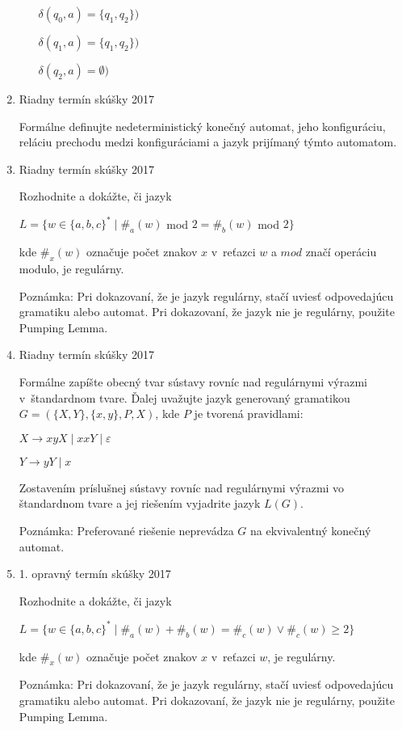 \documentclass[]{article}
\begin{document}
\begin{enumerate}
\begin{itemize}
			$\delta(q_0, a) = \{q_1, q_2\})$
			
			$\delta(q_1, a) = \{q_1, q_2\})$
			
			$\delta(q_2, a) = \emptyset)$
		\end{itemize}
		
		\item Riadny termín skúšky 2017
		
		Formálne definujte nedeterministický konečný automat, jeho konfiguráciu, reláciu prechodu medzi konfiguráciami a jazyk prijímaný týmto automatom.
		
		\item Riadny termín skúšky 2017
		
		Rozhodnite a dokážte, či jazyk
		
		$L = \{w \in \{a,b,c\}^* \mid \#_a(w)$ mod $2 = \#_b(w)$ mod $2\}$
		
		kde $\#_x(w)$ označuje počet znakov $x$ v~reťazci $w$ a $mod$ značí operáciu modulo, je regulárny.
		
		Poznámka: Pri dokazovaní, že je jazyk regulárny, stačí uviesť odpovedajúcu gramatiku alebo automat. Pri dokazovaní, že jazyk nie je regulárny, použite Pumping Lemma.
		
		\item Riadny termín skúšky 2017
		
		Formálne zapíšte obecný tvar sústavy rovníc nad regulárnymi výrazmi v~štandardnom tvare. Ďalej uvažujte jazyk generovaný gramatikou $G = (\{X,Y\}, \{x,y\}, P, X)$, kde $P$ je tvorená pravidlami:
		
		$X \rightarrow xyX \mid xxY \mid \varepsilon$
		
		$Y \rightarrow yY \mid x$
		
		Zostavením príslušnej sústavy rovníc nad regulárnymi výrazmi vo štandardnom tvare a jej riešením vyjadrite jazyk $L(G)$.
		
		Poznámka: Preferované riešenie neprevádza $G$ na ekvivalentný konečný automat.
		
		\item 1. opravný termín skúšky 2017
		
		Rozhodnite a dokážte, či jazyk
		
		$L = \{w \in \{a,b,c\}^* \mid \#_a(w) + \#_b(w) =  \#_c(w) \lor \#_c(w) \geq 2\}$
		
		kde $\#_x(w)$ označuje počet znakov $x$ v~reťazci $w$, je regulárny.
		
		Poznámka: Pri dokazovaní, že je jazyk regulárny, stačí uviesť odpovedajúcu gramatiku alebo automat. Pri dokazovaní, že jazyk nie je regulárny, použite Pumping Lemma.
		

\end{enumerate}
\end{document}
